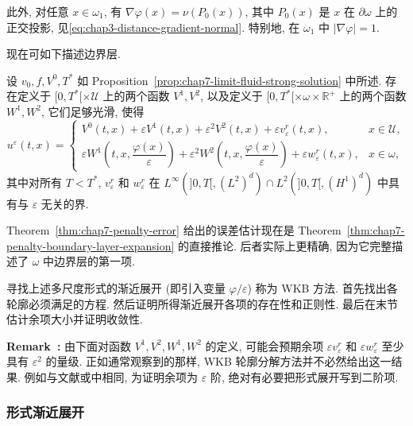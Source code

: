 \begin{sloppypar}
此外, 对任意 $x\in\omega_1$, 有
$\nabla\varphi(x)=\nu(P_0(x))$, 其中 $P_0(x)$ 是 $x$ 在 $\partial\omega$ 上的正交投影, 见\eqref{eq:chap3-distance-gradient-normal}. 特别地, 在 $\omega_1$ 中 $|\nabla\varphi|=1$.

现在可如下描述边界层.

\begin{Theorem}
\label{thm:chap7-penalty-boundary-layer-expansion}
设 $v_0,f,V^0,T^*$ 如 Proposition~\ref{prop:chap7-limit-fluid-strong-solution} 中所述. 存在定义于 $[0,T^*[\times\mathcal U$ 上的两个函数 $V^1,V^2$, 以及定义于 $[0,T^*[\times\omega\times\mathbb R^+$ 上的两个函数 $W^1,W^2$, 它们足够光滑, 使得
\[
 u^\varepsilon(t,x)=
 \begin{cases}
  V^0(t,x)+\varepsilon V^1(t,x)+\varepsilon^2V^2(t,x)
  +\varepsilon v_\varepsilon^r(t,x),&x\in\mathcal U,\\[3pt]
  \varepsilon W^1\left(t,x,\dfrac{\varphi(x)}\varepsilon\right)
  +\varepsilon^2W^2\left(t,x,\dfrac{\varphi(x)}\varepsilon\right)
  +\varepsilon w_\varepsilon^r(t,x),&x\in\omega,
 \end{cases}
\]
其中对所有 $T<T^*$, $v_\varepsilon^r$ 和 $w_\varepsilon^r$ 在
$L^\infty(]0,T[,(L^2)^d)\cap L^2(]0,T[,(H^1)^d)$ 中具有与 $\varepsilon$ 无关的界.
\end{Theorem}

Theorem~\ref{thm:chap7-penalty-error} 给出的误差估计现在是 Theorem~\ref{thm:chap7-penalty-boundary-layer-expansion} 的直接推论. 后者实际上更精确, 因为它完整描述了 $\omega$ 中边界层的第一项.

寻找上述多尺度形式的渐近展开 (即引入变量 $\varphi/\varepsilon$) 称为 WKB 方法. 首先找出各轮廓必须满足的方程. 然后证明所得渐近展开各项的存在性和正则性. 最后在末节估计余项大小并证明收敛性.

\par\noindent{}\textbf{Remark~\thechaptersevensectiontworemark:}\label{rem:chap7-second-order-wkb-necessity}
由下面对函数 $V^1,V^2,W^1,W^2$ 的定义, 可能会预期余项 $\varepsilon v_\varepsilon^r$ 和 $\varepsilon w_\varepsilon^r$ 至少具有 $\varepsilon^2$ 的量级. 正如通常观察到的那样, WKB 轮廓分解方法并不必然给出这一结果. 例如与文献或中相同, 为证明余项为 $\varepsilon$ 阶, 绝对有必要把形式展开写到二阶项.

\subsubsection{形式渐近展开}
\label{subsec:chap7-formal-asymptotic-expansion}


\end{sloppypar}
